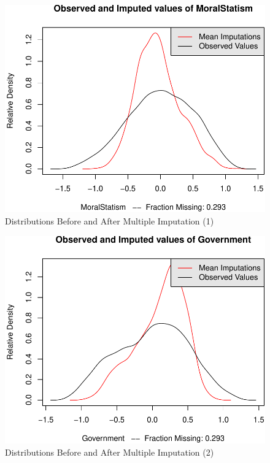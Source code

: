 \documentclass[12pt,]{article}
\begin{document}
\begin{figure}[htbp]
\centering
\includegraphics{figures/missing2-1.pdf}
\caption{Distributions Before and After Multiple Imputation (1)}
\end{figure}

\begin{figure}[htbp]
\centering
\includegraphics{figures/missing3-1.pdf}
\caption{Distributions Before and After Multiple Imputation (2)}
\end{figure}

\clearpage
\end{document}

